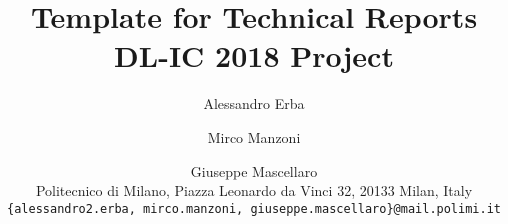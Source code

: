 \documentclass[10pt,twocolumn,letterpaper]{article}
\begin{document}
\title{Template for Technical Reports \\ DL-IC 2018 Project}

\author{
	Alessandro Erba \and Mirco Manzoni \and Giuseppe Mascellaro
	\\
	Politecnico di Milano, Piazza Leonardo da Vinci 32, 20133 Milan, Italy\\
	{\tt\small \{alessandro2.erba, mirco.manzoni, giuseppe.mascellaro\}@mail.polimi.it}
}

\maketitle








\appendix


{
	\small
	
	
}
\end{document}
